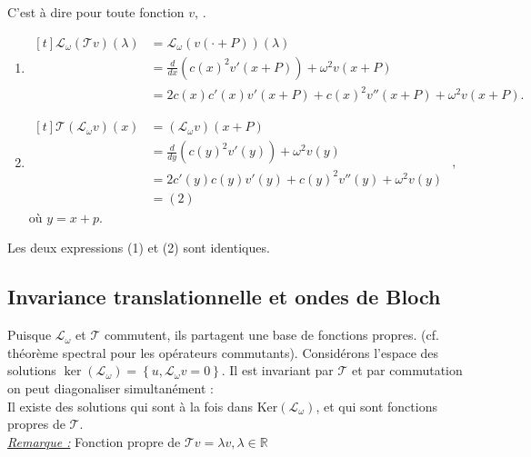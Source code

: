 \documentclass[12pt,a4paper]{article}
\begin{document}
	C'est à dire pour toute fonction $v$, .
	
	\begin{enumerate}
		\item[$(1)$] $\begin{aligned}[t]
			\mathcal L_\omega(\mathcal T v)(\lambda)
			&= \mathcal L_\omega(v(\cdot + P))(\lambda) \\
			&= \frac{d}{dx}(c(x)^2 v'(x+P)) + \omega^2 v(x+P) \\
			&= 2c(x)c'(x)v'(x+P) + c(x)^2 v''(x+P) + \omega^2 v(x+P).
		\end{aligned}$
		
		\vspace{.2cm}
		
		\item[$(2)$]  $\begin{aligned}[t]
			\mathcal T \left(\mathcal L_\omega v\right)(x) 
			&= \left(\mathcal L_\omega v\right)(x+P)\\
			&= \frac{d}{dy}\left(c(y)^2v'(y)\right) + \omega^2v(y)\\
			&= 2c'(y)c(y)v'(y) + c(y)^2v''(y) + \omega^2v(y) \\
			&= (2)
		\end{aligned}$
		, où $y = x + p$.
	\end{enumerate} 
	
	Les deux expressions (1) et (2) sont identiques.
	
	\subsection{Invariance translationnelle et ondes de Bloch}
	
	Puisque $\mathcal L_\omega$ et $\mathcal T$ commutent, ils partagent une base de fonctions propres. (cf. théorème spectral pour les opérateurs commutants). Considérons l'espace des solutions $\ker\left(\mathcal L_\omega\right) = \left\{u, \mathcal L_\omega v = 0\right\}$. Il est invariant par $\mathcal T$ et par commutation on peut diagonaliser simultanément :\\
	Il existe des solutions qui sont à la fois dans $\text{Ker}(\mathcal L_\omega)$, et qui sont fonctions propres de $\mathcal T$.\\
	
	\textit{\underline{Remarque :}} Fonction propre de $\mathcal T v = \lambda v, \lambda \in \mathbb{R}$\\
	
\end{document}
